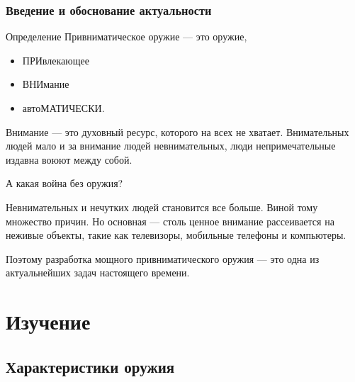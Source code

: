\begin{frame}
    \frametitle{Введение и обоснование актуальности}
    
    \begin{block}{Определение}
        \alert{Привниматическое} оружие --- это оружие, 
        \begin{itemize}
            \item \alert{ПРИ}влекающее 
            \item \alert{ВНИ}мание 
            \item авто\alert{МАТИЧЕСКИ}.
        \end{itemize}
    \end{block}
    
    \alert{Внимание} --- это духовный ресурс, которого на всех не хватает. Внимательных людей мало и за внимание людей невнимательных, люди непримечательные издавна воюют между собой. 
    
    А какая война без оружия?
\end{frame}
    
Невнимательных и нечутких людей становится все больше. Виной тому множество причин. Но основная --- столь ценное внимание рассеивается на неживые объекты, такие как телевизоры, мобильные телефоны и компьютеры.
    
Поэтому разработка мощного привниматического оружия --- это одна из актуальнейших задач настоящего времени.

\section{Изучение}

\subsection{Характеристики оружия}

